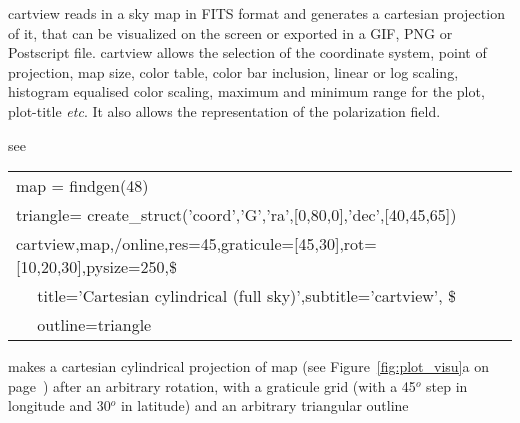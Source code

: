 \begin{codedescription}
{cartview reads in a \healpix sky map in FITS format and generates a
cartesian projection of it, that can be visualized on the screen or
exported in a GIF, PNG or Postscript file. cartview allows the selection of
the coordinate system, point of projection, map size, color table, color bar inclusion,
linear or log scaling, histogram equalised
color scaling, maximum and 
minimum range for the plot, plot-title {\it etc}. It also allows the representation of the
polarization field. }
\end{codedescription}

%
\begin{related}
  \begin{sulist}{} %
  \item[{\ }] see 
  \end{sulist}
\end{related}


\begin{example}
{
\begin{tabular}{l} %

map  = findgen(48) \\
triangle= create\_struct('coord','G','ra',[0,80,0],'dec',[40,45,65]) \\
cartview,map,/online,res=45,graticule=[45,30],rot=[10,20,30],pysize=250,\$ \\
$\quad$	   title='Cartesian cylindrical (full sky)',subtitle='cartview', \$ \\
$\quad$           outline=triangle \\
\end{tabular}
}
{makes a cartesian cylindrical projection of map (see Figure~\ref{fig:plot_visu}a on
page~\pageref{page:plot_visu}) after an arbitrary rotation, with a graticule grid
(with a 45$^o$ step in longitude and 30$^o$ in latitude) and an arbitrary triangular outline}
\end{example}

\newpage
